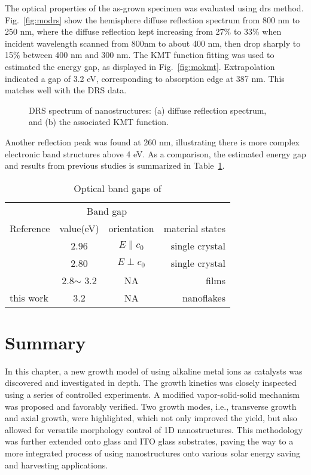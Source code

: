 %
The optical properties of the as-grown specimen was evaluated using \gls{drs} method. Fig.~\ref{fig:modrs} show the hemisphere diffuse reflection spectrum from 800 nm to 250 nm, where the diffuse reflection kept increasing from 27\% to 33\% when incident wavelength scanned from 800nm to about 400 nm, then drop sharply to 15\% between 400 nm and 300 nm. The KMT function fitting was used to estimated the energy gap, as displayed in Fig.~\ref{fig:mokmt}. Extrapolation indicated a gap of 3.2 eV, corresponding to absorption edge at 387 nm. This matches well with the DRS data.
\begin{figure}[htb]
\centering
{}\hspace{0.04\textwidth}
\caption[DRS spectrum of  nanostructures]{DRS spectrum of  nanostructures: (a) diffuse reflection spectrum, and (b) the associated KMT function.}
\label{fig:moo3drs}
\end{figure}
Another reflection peak was found at 260 nm, illustrating there is more complex electronic band structures above 4 eV. As a comparison, the estimated energy gap and results from previous studies is summarized in Table~\ref{tab:mobg}.
\begin{table}[htb]
\centering
\caption{Optical band gaps of }\label{tab:mobg}
\begin{tabular}{lccr}
\toprule
&\multicolumn{2}{c}{Band gap} \\
\cmidrule(l){2-3}
Reference & value(eV) & orientation & material states\\
\midrule
\cite{Deb1968}   & 2.96  & $E\parallel c_0$ & single crystal\\
\cite{Deb1968}   & 2.80  & $E\perp c_0$ & single crystal \\
\cite{Julien1995} & 2.8$\sim$ 3.2 & NA & films\\
 this work  & 3.2  & NA & nanoflakes\\
\bottomrule
\end{tabular}
\end{table}



\section{Summary}

In this chapter, a new growth model of  using alkaline metal ions as catalysts was discovered and investigated in depth. The growth kinetics was closely inspected using a series of controlled experiments. A modified vapor-solid-solid mechanism was proposed and favorably verified. Two growth modes, i.e., transverse growth and axial growth, were highlighted, which not only improved the yield, but also allowed for versatile morphology control of 1D  nanostructures. This methodology was further extended onto glass and ITO glass substrates, paving the way to a more integrated process of using  nanostructures onto various solar energy saving and harvesting applications. 
